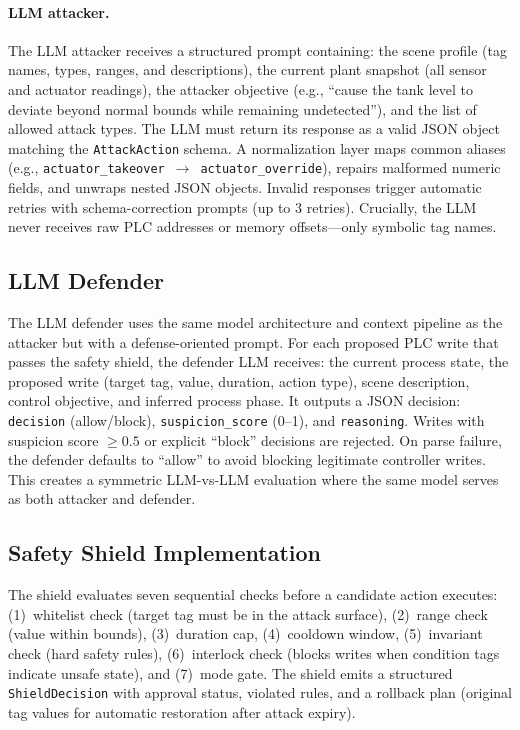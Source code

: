 \paragraph{LLM attacker.}
The LLM attacker receives a structured prompt containing: the scene profile (tag names, types, ranges, and descriptions), the current plant snapshot (all sensor and actuator readings), the attacker objective (e.g., ``cause the tank level to deviate beyond normal bounds while remaining undetected''), and the list of allowed attack types. The LLM must return its response as a valid JSON object matching the \texttt{AttackAction} schema. A normalization layer maps common aliases (e.g., \texttt{actuator\_takeover}~$\to$~\texttt{actuator\_override}), repairs malformed numeric fields, and unwraps nested JSON objects. Invalid responses trigger automatic retries with schema-correction prompts (up to 3 retries). Crucially, the LLM never receives raw PLC addresses or memory offsets---only symbolic tag names.

\subsection{LLM Defender}

The LLM defender uses the same model architecture and context pipeline as the attacker but with a defense-oriented prompt. For each proposed PLC write that passes the safety shield, the defender LLM receives: the current process state, the proposed write (target tag, value, duration, action type), scene description, control objective, and inferred process phase. It outputs a JSON decision: \texttt{decision} (allow/block), \texttt{suspicion\_score} (0--1), and \texttt{reasoning}. Writes with suspicion score $\geq 0.5$ or explicit ``block'' decisions are rejected. On parse failure, the defender defaults to ``allow'' to avoid blocking legitimate controller writes. This creates a symmetric LLM-vs-LLM evaluation where the same model serves as both attacker and defender.

\subsection{Safety Shield Implementation}
\label{sec:impl:shield-impl}

The shield evaluates seven sequential checks before a candidate action executes: (1)~whitelist check (target tag must be in the attack surface), (2)~range check (value within bounds), (3)~duration cap, (4)~cooldown window, (5)~invariant check (hard safety rules), (6)~interlock check (blocks writes when condition tags indicate unsafe state), and (7)~mode gate. The shield emits a structured \texttt{ShieldDecision} with approval status, violated rules, and a rollback plan (original tag values for automatic restoration after attack expiry).

